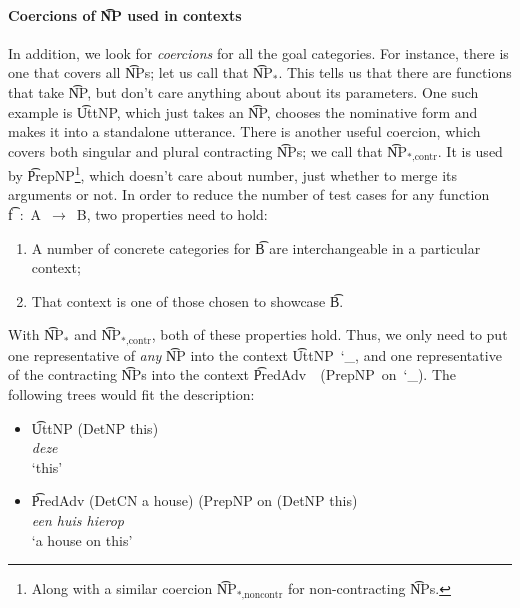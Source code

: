 \paragraph{Coercions of \t{NP} used in contexts} In addition, we look
for \emph{coercions} for all the goal categories. For instance, there
is one that covers all \t{NP}s; let us call that \t{NP$_*$}. This
tells us that there are functions that take \t{NP}, but don’t care
anything about about its parameters. One such example is \t{UttNP},
which just takes an \t{NP}, chooses the nominative form and makes it
into a standalone utterance.  There is another useful coercion, which
covers both singular and plural contracting \t{NP}s; we call that
\t{NP$_{*\text{,contr}}$}. It is used by \t{PrepNP}\footnote{Along
  with a similar coercion \t{NP$_{*\text{,noncontr}}$} for
  non-contracting \t{NP}s.}, which doesn't care about number, just
whether to merge its arguments or not.  In order to reduce the number
of test cases for any function \t{f~:~A~$\rightarrow$~B}, two
properties need to hold:
\begin{enumerate}
\item A number of concrete categories for \t{B} are interchangeable in a particular
context;
\item That context is one of those chosen to showcase \t{B}.
\end{enumerate}

\noindent With \t{NP$_*$} and \t{NP$_\text{*,contr}$}, both of these
properties hold.
Thus, we only need to put one representative of \emph{any} \t{NP} into
the context \t{UttNP~\char`_}, and one representative of the
contracting \t{NP}s into the context \t{PredAdv~~(PrepNP~on~\char`_)}.
The following trees would fit the description:

\begin{itemize}
\item[] \t{UttNP (DetNP this)}  \\
 \emph{deze} \\
 `this'
\item[] \t{PredAdv (DetCN a house) (PrepNP on (DetNP this)}  \\
\emph{een huis hierop} \\
`a house on this'
\end{itemize}



